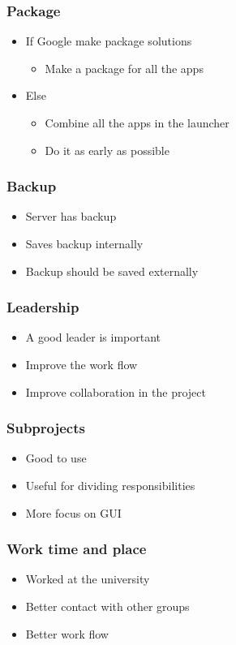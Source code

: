 \begin{frame}
	\frametitle{Package}
	\begin{itemize}
		\item If Google make package solutions
			\begin{itemize}
				\item Make a package for all the apps
			\end{itemize}
		\item Else
			\begin{itemize}
				\item Combine all the apps in the launcher
				\item Do it as early as possible
			\end{itemize}
	\end{itemize}
\end{frame}

\begin{frame}
	\frametitle{Backup}
	\begin{itemize}
		\item Server has backup
		\item Saves backup internally
		\item Backup should be saved externally
	\end{itemize}
\end{frame}

\begin{frame}
	\frametitle{Leadership}
	\begin{itemize}
		\item A good leader is important
		\item Improve the work flow
		\item Improve collaboration in the project
	\end{itemize}
\end{frame}

\begin{frame}
	\frametitle{Subprojects}
	\begin{itemize}
		\item Good to use
		\item Useful for dividing responsibilities
		\item More focus on GUI
	\end{itemize}
\end{frame}

\begin{frame}
	\frametitle{Work time and place}
	\begin{itemize}
		\item Worked at the university
		\item Better contact with other groups
		\item Better work flow
	\end{itemize}
\end{frame}
